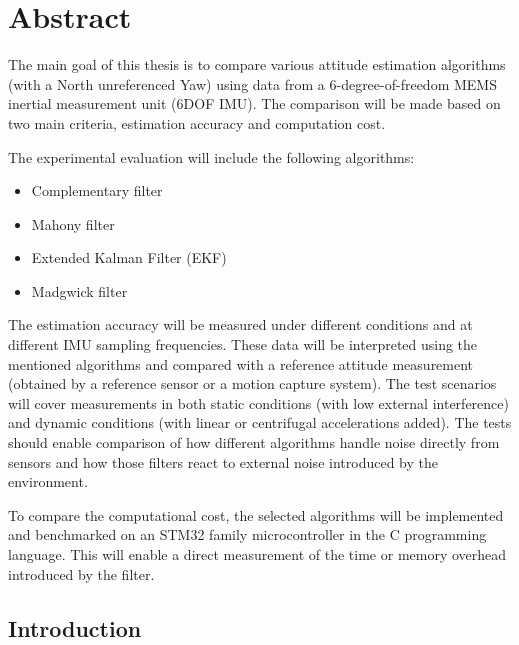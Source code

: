 \chapter{Abstract}

The main goal of this thesis is to compare various attitude estimation algorithms (with a North unreferenced Yaw) using data from a 6-degree-of-freedom MEMS inertial measurement unit (6DOF IMU). The comparison will be made based on two main criteria, estimation accuracy and computation cost.

The experimental evaluation will include the following algorithms:
\begin{itemize}
	\item Complementary filter
	\item Mahony filter
	\item Extended Kalman Filter (EKF)
	\item Madgwick filter
\end{itemize}

The estimation accuracy will be measured under different conditions and at different IMU sampling frequencies. These data will be interpreted using the mentioned algorithms and compared with a reference attitude measurement (obtained by a reference sensor or a motion capture system). The test scenarios will cover measurements in both static conditions (with low external interference) and dynamic conditions (with linear or centrifugal accelerations added). The tests should enable comparison of how different algorithms handle noise directly from sensors and how those filters react to external noise introduced by the environment.

To compare the computational cost, the selected algorithms will be implemented and benchmarked on an STM32 family microcontroller in the C programming language. This will enable a direct measurement of the time or memory overhead introduced by the filter.

\section{Introduction}